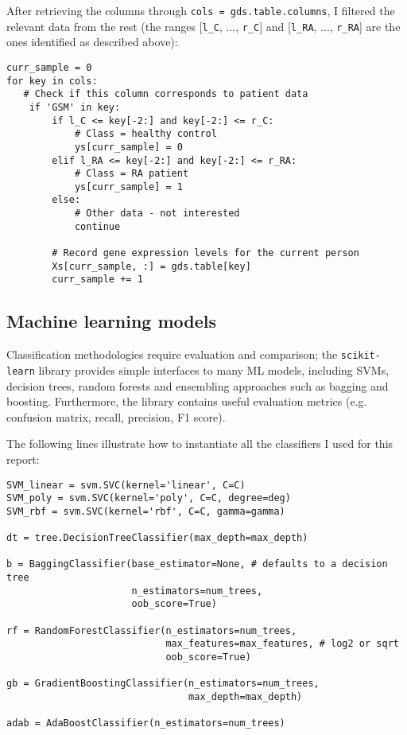 \documentclass[11pt]{article}
\numberwithin{equation}{section}
\begin{document}
After retrieving the columns through \texttt{cols = gds.table.columns}, I filtered the relevant data from the rest (the ranges [\texttt{l\_C}, ..., \texttt{r\_C}] and [\texttt{l\_RA}, ..., \texttt{r\_RA}] are the ones identified as described above):
\begin{verbatim}
curr_sample = 0
for key in cols:
   # Check if this column corresponds to patient data
    if 'GSM' in key:
        if l_C <= key[-2:] and key[-2:] <= r_C:
            # Class = healthy control
            ys[curr_sample] = 0
        elif l_RA <= key[-2:] and key[-2:] <= r_RA:
            # Class = RA patient
            ys[curr_sample] = 1
        else:
            # Other data - not interested
            continue
        
        # Record gene expression levels for the current person
        Xs[curr_sample, :] = gds.table[key]
        curr_sample += 1
\end{verbatim}

\subsection{Machine learning models}

Classification methodologies require evaluation and comparison; the \texttt{scikit-learn} library \cite{scikit-learn} provides simple interfaces to many ML models, including SVMs, decision trees, random forests and ensembling approaches such as bagging and boosting. Furthermore, the library contains useful evaluation metrics (e.g. confusion matrix, recall, precision, F1 score).

The following lines illustrate how to instantiate all the classifiers I used for this report:
\begin{verbatim}
SVM_linear = svm.SVC(kernel='linear', C=C)
SVM_poly = svm.SVC(kernel='poly', C=C, degree=deg)
SVM_rbf = svm.SVC(kernel='rbf', C=C, gamma=gamma)

dt = tree.DecisionTreeClassifier(max_depth=max_depth)

b = BaggingClassifier(base_estimator=None, # defaults to a decision tree
                      n_estimators=num_trees,
                      oob_score=True)
                      
rf = RandomForestClassifier(n_estimators=num_trees,
                            max_features=max_features, # log2 or sqrt
                            oob_score=True)

gb = GradientBoostingClassifier(n_estimators=num_trees,
                                max_depth=max_depth)

adab = AdaBoostClassifier(n_estimators=num_trees)
\end{verbatim}
\end{document}
